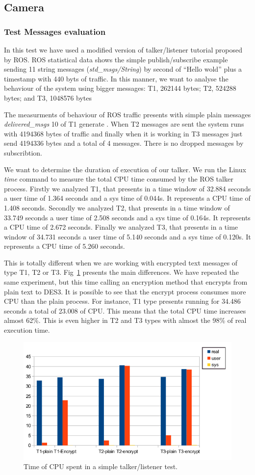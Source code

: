 \documentclass[journal,twoside]{JoPhA}
\begin{document}
\subsection{Camera}

\subsubsection{Test Messages evaluation}

In this test we have used a modified version of talker/listener tutorial proposed by ROS. 
ROS statistical data shows the simple publish/subscribe example sending 11 string messages ({\em std\_msgs/String}) by second of ``Hello wold'' plus a timestamp with 440 byts of traffic.
In this manner, we want to analyse the behaviour of the system using bigger messages: T1, 262144 bytes; T2,  524288 bytes; and T3, 1048576 bytes 

The measurments of behaviour of ROS traffic presents with simple plain messages {\em delivered\_msgs} 10 of T1 generate . When T2 messages are sent the system runs with 4194368 bytes of traffic and finally when it is working in  T3 messages just send 4194336 bytes and a total of 4 messages. There is no dropped messages by subscribtion.

We want to determine the duration of execution of our talker. We run the Linux {\em time} command to measure the total CPU time consumed by the ROS talker process. 
Firstly we analyzed T1, that presents in a time window of 32.884 seconds a user time of  1.364 seconds and a sys time of 0.044s. It represents a CPU time of 1.408 seconds.
Secondly we analyzed T2, that presents in a time window of 33.749 seconds a user time of  2.508 seconds and a sys time of 0.164s. It represents a CPU time of 2.672 seconds.
Finally we analyzed T3, that presents in a time window of 34.731 seconds a user time of  5.140 seconds and a sys time of 0.120s. It represents a CPU time of 5.260 seconds.

This is totally different when we are working with encrypted text messages of type T1, T2 or T3. Fig~\ref{fig:time_text_CPU} presents the main differences. We have repeated the same experiment, but this time calling an encryption method that encrypts from plain text to DES3. It is possible to see that the encrypt process consumes more CPU than  the plain process.
For instance, T1 type presents running for  34.486 seconds a total of 23.008 of CPU. This means that the total CPU time increases almost 62\%. This is even higher in T2 and T3 types with almost the 98\% of real execution time.
\begin{figure}[ht!]
    \centering
    \includegraphics[width=.5\textwidth]{Tiempos_CPU_cifrado_texto.png}
    \caption{Time of CPU spent in a simple talker/listener test.}
  \label{fig:time_text_CPU}
\end{figure}
\end{document}
